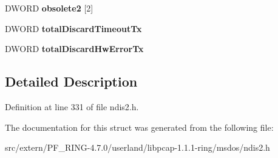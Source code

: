 \begin{DoxyCompactItemize}
\item 
\hypertarget{struct___mac_status_table_aa4e0db09ac551948367ecda1e39c3613}{
DWORD {\bfseries obsolete2} \mbox{[}2\mbox{]}}
\label{struct___mac_status_table_aa4e0db09ac551948367ecda1e39c3613}

\item 
\hypertarget{struct___mac_status_table_a01d15adc59aab86e80f95d84362606bc}{
DWORD {\bfseries totalDiscardTimeoutTx}}
\label{struct___mac_status_table_a01d15adc59aab86e80f95d84362606bc}

\item 
\hypertarget{struct___mac_status_table_aeb1625ebffaefc51f3e3c6fb74b064e1}{
DWORD {\bfseries totalDiscardHwErrorTx}}
\label{struct___mac_status_table_aeb1625ebffaefc51f3e3c6fb74b064e1}

\end{DoxyCompactItemize}


\subsection{Detailed Description}


Definition at line 331 of file ndis2.h.



The documentation for this struct was generated from the following file:\begin{DoxyCompactItemize}
\item 
src/extern/PF\_\-RING-\/4.7.0/userland/libpcap-\/1.1.1-\/ring/msdos/ndis2.h\end{DoxyCompactItemize}
